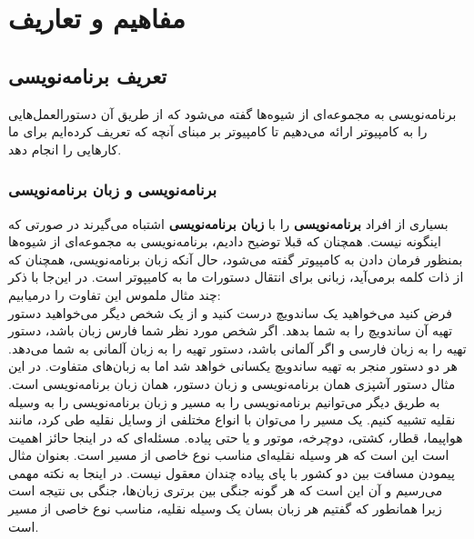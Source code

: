 \part{مفاهیم و تعاریف}
\chapter{تعریف برنامه‌نویسی}
برنامه‌نویسی به مجموعه‌ای از شیوه‌ها گفته می‌شود که از طریق آن دستورالعمل‌هایی را به کامپیوتر ارائه می‌دهیم تا کامپیوتر بر مبنای آنچه که تعریف کرده‌ایم برای ما کارهایی را انجام دهد. 
\section{برنامه‌نویسی و زبان برنامه‌نویسی}
بسیاری از افراد \textbf{برنامه‌نویسی } را با \textbf{زبان برنامه‌نویسی} اشتباه می‌گیرند در صورتی که اینگونه نیست. همچنان که قبلا توضیح دادیم، برنامه‌نویسی به مجموعه‌ای از شیوه‌ها بمنظور فرمان دادن به کامپیوتر گفته می‌شود، حال آنکه زبان برنامه‌نویسی، همچنان که از ذات کلمه برمی‌آید، زبانی برای انتقال دستورات ما به کامیپوتر است. در این‌جا با ذکر چند مثال ملموس این تفاوت را درمیابیم:\\
فرض کنید می‌خواهید یک ساندویچ درست کنید و از یک شخص دیگر می‌خواهید دستور تهیه آن ساندویچ را به شما بدهد. اگر شخص مورد نظر شما فارس زبان باشد، دستور تهیه را به زبان فارسی و اگر آلمانی باشد، دستور تهیه را به زبان آلمانی به شما می‌دهد. هر دو دستور منجر به تهیه ساندویچ یکسانی خواهد شد اما به زبان‌های متفاوت. در این مثال دستور آشپزی همان برنامه‌نویسی و زبان دستور، همان زبان برنامه‌نویسی است.
به طریق دیگر می‌توانیم برنامه‌نویسی را به مسیر و  زبان برنامه‌نویسی را به وسیله نقلیه تشبیه کنیم. یک مسیر را می‌توان با انواع مختلفی از وسایل نقلیه طی کرد، مانند هواپیما، قطار، کشتی، دوچرخه، موتور و یا حتی پیاده. مسئله‌ای که در اینجا حائز اهمیت است این است که هر وسیله نقلیه‌ای مناسب نوع خاصی از مسیر است. بعنوان مثال پیمودن مسافت بین دو کشور با پای پیاده چندان معقول نیست. در اینجا به نکته مهمی می‌رسیم و آن این است که هر گونه جنگی بین برتری زبان‌ها، جنگی بی نتیجه است زیرا همانطور که گفتیم هر زبان بسان یک وسیله نقلیه، مناسب نوع خاصی از مسیر است.